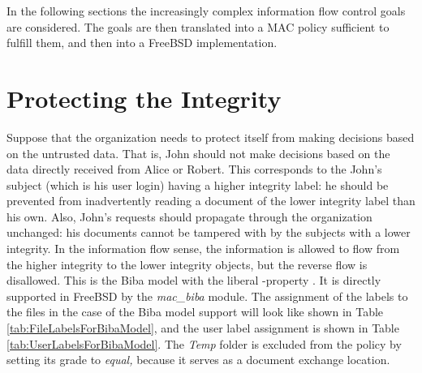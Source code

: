 \documentclass[10pt,a4paper,conference,onecolumn]{IEEEtran}
\newcommand{\KBERcode}[1]{\textsl{#1}}
\begin{document}
In the following sections the increasingly complex information flow 
control goals are considered. The goals are then translated into 
a MAC policy sufficient to fulfill them, and then into a
FreeBSD implementation. 


\section{Protecting the Integrity}

Suppose that the organization needs to protect itself from making
decisions based on the untrusted data. That is, John should not
make decisions based on the data directly received from Alice or
Robert.  This corresponds to the John's subject (which is his user login) 
having a higher integrity label: he
should be prevented from inadvertently reading a document of the
lower integrity label than his own. Also, John's requests should 
propagate through the organization unchanged: his documents
cannot be tampered with by the subjects with a lower integrity.
In the information flow sense, the information is allowed to flow
from the higher integrity to the lower integrity objects, but the
reverse flow is disallowed. This is the Biba model with the liberal
-property \cite{DBLP:journals/computer/Sandhu93}.
It is directly supported in FreeBSD by the \KBERcode{mac\_biba} module.
The assignment of the labels to the files in the case of the Biba
model support will look like shown in Table \ref{tab:FileLabelsForBibaModel},
and the user label assignment is shown in Table \ref{tab:UserLabelsForBibaModel}.
The \KBERcode{Temp} folder is excluded from the policy by setting its grade to
\KBERcode{equal,} because it serves
as a document exchange location.
\end{document}
